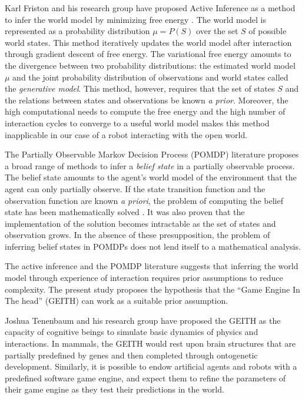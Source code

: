 \documentclass[runningheads]{llncs}
\begin{document}
Karl Friston and his research group have proposed Active Inference \cite[e.g.]{smith_step-by-step_2022} as a method to infer the world model by minimizing free energy \cite{friston_free-energy_2010}.
The world model is represented as a probability distribution $\mu = P(S)$ over the set $S$ of possible world states. 
This method iteratively updates the world model after interaction through gradient descent of free energy. 
The variational free energy amounts to the divergence between two probability distributions: the estimated world model $\mu$ and the joint probability distribution of observations and world states called the \textit{generative model}. 
This method, however, requires that the set of states $S$ and the relations between states and observations be known \textit{a prior}. 
Moreover, the high computational needs to compute the free energy and the high number of interaction cycles to converge to a useful world model makes this method inapplicable in our case of a robot interacting with the open world. 

The Partially Observable Markov Decision Process (POMDP) literature proposes a broad range of methods to infer a \textit{belief state} in a partially observable process.
The belief state amounts to the agent's world model of the environment that the agent can only partially observe.  
If the state transition function and the observation function are known \textit{a priori}, the problem of computing the belief state has been mathematically solved \cite{astrom1965optimal}. 
It was also proven that the implementation of the solution becomes intractable as the set of states and observation grows. 
In the absence of these presupposition, the problem of inferring belief states in POMDPs does not lend itself to a mathematical analysis. 

The active inference and the POMDP literature suggests that inferring the world model through experience of interaction requires prior assumptions to reduce complexity. 
The present study proposes the hypothesis that the ``Game Engine In The head'' (GEITH) can work as a suitable prior assumption. 

Joshua Tenenbaum and his research group have proposed the GEITH \cite{battaglia_simulation_2013} as the capacity of cognitive beings to simulate basic dynamics of physics and interactions. 
In mammals, the GEITH would rest upon brain structures that are partially predefined by genes and then completed through ontogenetic development.  
Similarly, it is possible to endow artificial agents and robots with a predefined software game engine, and expect them to refine the parameters of their game engine as they test their predictions in the world.
\end{document}
